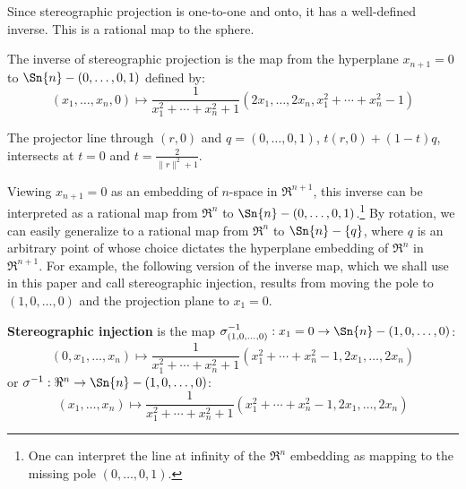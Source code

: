 Since stereographic projection is one-to-one and onto,
it has a well-defined inverse.
This is a rational map to the sphere.
%
\begin{lemma}
The inverse of stereographic projection is the map from the hyperplane
$x_{n+1}=0$ to $\Sn{n} - (0,\ldots,0,1)$ defined by:
\[ (x_1,\ldots,x_n,0) \mapsto
	\frac{1}{x_1^2 + \cdots + x_n^2 + 1} 
	(2x_1, \ldots, 2x_n, x_1^2 + \cdots + x_n^2 - 1)
\]	%
\end{lemma}
\prf
The projector line through $(r,0)$ and $q = (0,\ldots,0,1)$, $t(r,0) + (1-t)q$,
intersects  at $t=0$ and $t=\frac{2}{\|r\|^2 + 1}$.
\QED

Viewing $x_{n+1}=0$ as an embedding of $n$-space in $\Re^{n+1}$, 
this inverse can be interpreted as a rational map from $\Re^{n}$ to 
$\Sn{n} - (0,\ldots,0,1)$.\footnote{One can interpret the 
	line at infinity of the $\Re^n$ embedding
	as mapping to the missing pole $(0,\ldots,0,1)$.}
By rotation, we can easily generalize to a rational map from $\Re^n$
to $\Sn{n} - \{q\}$, where $q$ is an arbitrary point of 
whose choice dictates the hyperplane embedding of $\Re^n$ in $\Re^{n+1}$.
For example, the following version of the inverse map, which we shall use in
this paper and call stereographic injection, results from 
moving the pole to $(1,0,\ldots,0)$ and the projection plane to $x_1=0$.

\begin{defn2}
{\rm 
{\bf Stereographic injection} is the map 
$\sigma^{-1}_{(1,0,\ldots,0)}: x_{1}=0 \rightarrow \Sn{n} - (1,0,\ldots,0)$:
\begin{equation}
\label{eq:injection}
(0,x_1,\ldots,x_n) \mapsto
	\frac{1}{x_1^2 + \cdots + x_n^2 + 1} 
	(x_1^2 + \cdots + x_n^2 - 1, 2x_1, \ldots, 2x_n)
\end{equation}
or $\sigma^{-1}: \Re^n \rightarrow \Sn{n} - (1,0,\ldots,0)$:
\begin{equation}
\label{eq:si}
(x_1,\ldots,x_n) \mapsto
	\frac{1}{x_1^2 + \cdots + x_n^2 + 1} 
	(x_1^2 + \cdots + x_n^2 - 1, 2x_1, \ldots, 2x_n)
\end{equation}
}
\end{defn2}


